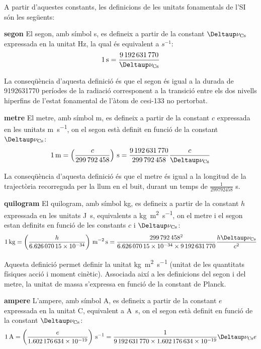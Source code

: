 A partir d'aquestes constants, les definicions de les unitats fonamentals de l'SI són les següents:
\begin{list}{}
   {\setlength{\labelwidth}{22mm} \setlength{\leftmargin}{22mm} \setlength{\labelsep}{2mm}}
   \item[\textbf{segon}] El segon, amb símbol s, es defineix a partir de la constant $\Deltaup\nu\ped{Cs}$ expressada en la unitat Hz, la qual és equivalent a $\unit{s^{-1}}$:
       \[
            \qty{1}{s} = \frac{\num{9192631770}}{\Deltaup\nu\ped{Cs}}
       \]

    La conseqüència d'aquesta definició és que el segon és igual a la durada de \num{9192631770} períodes de la
   radiació corresponent a la transició entre els dos nivells
  hiperfins de l'estat fonamental de l'àtom de cesi-133 no pertorbat.

   \item[\textbf{metre}]  El metre, amb símbol m, es defineix a partir de la constant $c$ expressada en les unitats \unit{m.s^{-1}}, on el segon està definit en funció de la constant  $\Deltaup\nu\ped{Cs}$:
       \[
            \qty{1}{m} = \left(\frac{c}{\num{299792458}}\right)\unit{\,s} = \frac{\num{9192631770}}{\num{299792458}}\frac{c}{\Deltaup\nu\ped{Cs}}
       \]

    La conseqüència d'aquesta definició és que el metre és igual a la longitud de la trajectòria recorreguda per la llum
   en el buit, durant un temps de $\frac{1}{\num{299792458}}$ s.

   \item[\textbf{quilogram}] El quilogram, amb símbol kg, es defineix a partir de la constant $h$ expressada en les unitats \unit{J.s}, equivalents a \unit{kg.m^2.s^{-1}}, on el metre i el segon estan definits en funció de les constants $c$ i $\Deltaup\nu\ped{Cs}$:
       \[
            \qty{1}{kg} = \left(\frac{h}{\num{6,62607015 e-34}}\right)\unit{\,m^{-2}.s} = \frac{\num{299792458}^2}{\num{6,62607015 e-34}\times\num{9192631770}}\frac{h\Deltaup\nu\ped{Cs}}{c^2}
       \]

   Aquesta definició permet definir la unitat \unit{kg.m^2.s^{-1}} (unitat de les quantitats físiques acció i moment cinètic). Associada així a les definicions del segon i del metre,  la unitat de massa s'expressa en funció  de la constant de Planck.


   \item[\textbf{ampere}] L'ampere, amb símbol A, es defineix a partir de la constant $e$ expressada en la unitat C,  equivalent a \unit{A.s}, on el segon està definit en funció de la constant  $\Deltaup\nu\ped{Cs}$:
       \[
            \qty{1}{A} = \left(\frac{e}{\num{1,602176634 e-19}}\right)\unit{\,s^{-1}} = \frac{1}{\num{9192631770}\times\num{1,602176634 e-19}} \Deltaup\nu\ped{Cs} e
       \]


\end{list}
